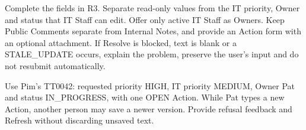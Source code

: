 {Complete the fields in R3. Separate read-only values from the IT priority, Owner and status that IT Staff can edit. Offer only active IT Staff as Owners. Keep Public Comments separate from Internal Notes, and provide an Action form with an optional attachment. If Resolve is blocked, text is blank or a STALE\_UPDATE occurs, explain the problem, preserve the user's input and do not resubmit automatically.}
\begin{contenttable}
{Use Pim’s TT0042: requested priority HIGH, IT priority MEDIUM, Owner Pat and status IN\_PROGRESS, with one OPEN Action. While Pat types a new Action, another person may save a newer version. Provide refusal feedback and Refresh without discarding unsaved text.}
\end{contenttable}
\examTicketForm
\newpage

